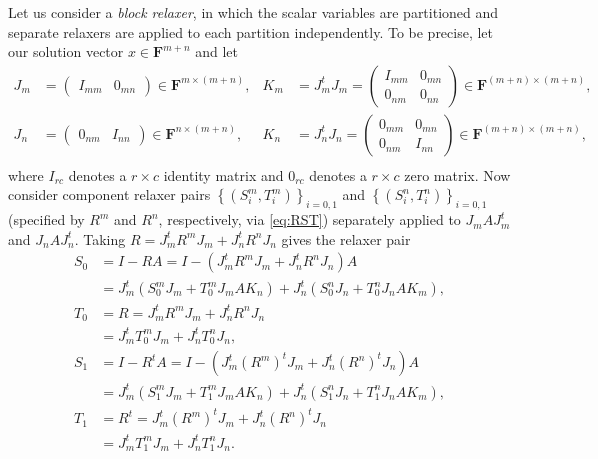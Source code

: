 \documentclass{article}
\begin{document}
Let us consider a \emph{block relaxer}, in which the scalar variables are partitioned and separate relaxers are applied to each partition independently. To be precise, let our solution vector $x \in \mathbf{F}^{m + n}$ and let
\begin{align*}
J_m & = \begin{pmatrix} I_{mm} & 0_{mn} \end{pmatrix} \in \mathbf{F}^{m \times (m + n)}, &
K_m & = J_m^t J_m = \begin{pmatrix} I_{mm} & 0_{mn} \\ 0_{nm} & 0_{nn} \end{pmatrix} \in \mathbf{F}^{(m + n) \times (m + n)}, \\
J_n & = \begin{pmatrix} 0_{nm} & I_{nn} \end{pmatrix} \in \mathbf{F}^{n \times (m + n)}, &
K_n & = J_n^t J_n = \begin{pmatrix} 0_{mm} & 0_{mn} \\ 0_{nm} & I_{nn} \end{pmatrix} \in \mathbf{F}^{(m + n) \times (m + n)}, \\
\end{align*}
where $I_{rc}$ denotes a $r \times c$ identity matrix and $0_{rc}$ denotes a $r \times c$ zero matrix. Now consider component relaxer pairs $\left\{ \left( S^m_i, T^m_i \right) \right\}_{i = 0,1}$ and $\left\{ \left( S^n_i, T^n_i \right) \right\}_{i = 0,1}$ (specified by $R^m$ and $R^n$, respectively, via \eqref{eq:RST}) separately applied to $J_m A J_m^t$ and $J_n A J_n^t$. Taking $R = J_m^t R^m J_m + J_n^t R^n J_n$ gives the relaxer pair
\begin{align*}
S_0 & = I - R A
      = I - \left( J_m^t R^m J_m + J_n^t R^n J_n \right) A \\
    & = J_m^t \left( S^m_0 J_m + T^m_0 J_m A K_n \right)
      + J_n^t \left( S^n_0 J_n + T^n_0 J_n A K_m \right),\\
T_0 & = R
      = J_m^t R^m J_m + J_n^t R^n J_n \\
    & = J_m^t T^m_0 J_m + J_n^t T^n_0 J_n, \\
S_1 & = I - R^t A
      = I - \left( J_m^t \left( R^m \right)^t J_m + J_n^t \left( R^n \right)^t J_n \right) A \\
    & = J_m^t \left( S^m_1 J_m + T^m_1 J_m A K_n \right)
      + J_n^t \left( S^n_1 J_n + T^n_1 J_n A K_m \right),\\
T_1 & = R^t
      = J_m^t \left( R^m \right)^t J_m + J_n^t \left( R^n \right)^t J_n \\
    & = J_m^t T^m_1 J_m + J_n^t T^n_1 J_n. \\
\end{align*}
\end{document}
